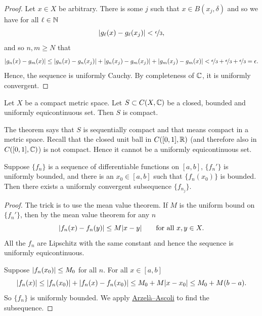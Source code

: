\begin{proof}
Let $x \in X$ be arbitrary.  There is some $j$ such that
$x \in B(x_j,\delta)$ and so we have for all $\ell \in {\mathbb{N}}$
\begin{equation*}
\lvert {g_\ell(x)-g_\ell(x_j)} \rvert < \nicefrac{\epsilon}{3},
\end{equation*}
and so $n,m \geq N$ that
\begin{equation*}
\lvert {g_n(x)-g_m(x)} \rvert \leq
\lvert {g_n(x)-g_n(x_j)} \rvert +
\lvert {g_n(x_j)-g_m(x_j)} \rvert +
\lvert {g_m(x_j)-g_m(x)} \rvert <
\nicefrac{\epsilon}{3} +
\nicefrac{\epsilon}{3} +
\nicefrac{\epsilon}{3} = \epsilon .
\end{equation*}
Hence, the sequence is uniformly Cauchy.  By completeness of ${\mathbb{C}}$,
it is uniformly convergent.
\end{proof}

\begin{cor}
Let $X$ be a compact metric space.
Let $S \subset C(X,{\mathbb{C}})$ be a closed, bounded and uniformly equicontinuous set.
Then $S$ is compact.
\end{cor}

The theorem says that $S$
is sequentially compact and that means
compact in a metric space.
Recall that the closed unit ball in $C([0,1],{\mathbb{R}})$ (and therefore also in
$C([0,1],{\mathbb{C}})$) is not compact.
Hence it cannot be a uniformly equicontinuous set.

\begin{cor}
Suppose $\{ f_n \}$ is a sequence of differentiable functions on $[a,b]$,
$\{ f_n' \}$ is uniformly bounded, and there is an
$x_0 \in [a,b]$ such that $\{ f_n(x_0) \}$ is bounded.
Then there exists a uniformly convergent
subsequence $\{ f_{n_j} \}$.
\end{cor}

\begin{proof}
The trick is to use the mean value theorem.  If $M$ is the uniform bound on
$\{ f_n' \}$, then by the mean value theorem for any $n$
\begin{equation*}
\lvert {f_n(x)-f_n(y)} \rvert \leq M \lvert {x-y} \rvert \qquad \text{for all } x,y \in X.
\end{equation*}
All the $f_n$ are Lipschitz with the same constant and hence
the sequence is
uniformly equicontinuous.

Suppose $\lvert {f_n(x_0)} \rvert \leq M_0$ for all $n$.
For all $x \in [a,b]$
\begin{equation*}
\lvert {f_n(x)} \rvert \leq \lvert {f_n(x_0)} \rvert+ \lvert {f_n(x)-f_n(x_0)} \rvert \leq M_0+ M \lvert {x-x_0} \rvert
\leq M_0 + M(b-a) .
\end{equation*}
So $\{ f_n \}$ is uniformly bounded.
We apply \hyperref[thm:arzelaascoli]{Arzel\`a--Ascoli} to find the subsequence.
\end{proof}

